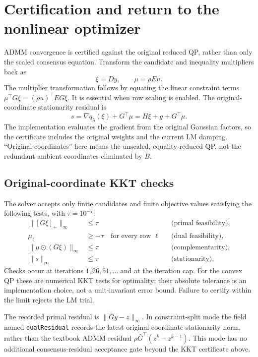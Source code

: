 \documentclass[11pt,letterpaper]{article}
\newcommand{\pos}[1]{[#1]_{+}}
\newcommand{\code}[1]{\texttt{\small #1}}
\begin{document}
\section{Certification and return to the nonlinear optimizer}
ADMM convergence is certified against the original reduced QP, rather than
only the scaled consensus equation. Transform the candidate and inequality
multipliers back as
\begin{equation}
  \xi=Dy,\qquad \mu=\rho E u.
  \label{eq:recover}
\end{equation}
The multiplier transformation follows by equating the linear constraint terms
$\mu^\top G\xi=(\rho u)^\top EG\xi$. It is essential when row scaling is
enabled. The original-coordinate stationarity residual is
\begin{equation}
  s=\nabla q_\lambda(\xi)+G^\top\mu
    =H\xi+g+G^\top\mu.
  \label{eq:stationarity}
\end{equation}
The implementation evaluates the gradient from the original Gaussian factors,
so the certificate includes the original weights and the current LM damping.
``Original coordinates'' here means the unscaled, equality-reduced QP, not
the redundant ambient coordinates eliminated by $B$.

\subsection{Original-coordinate KKT checks}
The solver accepts only finite candidates and finite objective values satisfying
the following tests, with $\tau=10^{-7}$:
\begin{align}
  \|\pos{G\xi}\|_\infty&\leq\tau
      &&\text{(primal feasibility)},\\
  \mu_\ell&\geq-\tau\quad\text{for every row }\ell
      &&\text{(dual feasibility)},\\
  \|\mu\odot(G\xi)\|_\infty&\leq\tau
      &&\text{(complementarity)},\\
  \|s\|_\infty&\leq\tau
      &&\text{(stationarity)}.
\end{align}
Checks occur at iterations $1,26,51,\ldots$ and at the iteration cap. For the
convex QP these are numerical KKT tests for optimality; their absolute
tolerance is an implementation choice, not a unit-invariant error bound.
Failure to certify within the limit rejects the LM trial.

The recorded primal residual is $\|\bar Gy-z\|_\infty$. In constraint-split
mode the field named \code{dualResidual} records the latest original-coordinate
stationarity norm, rather than the textbook ADMM residual
$\rho\bar G^\top(z^k-z^{k-1})$. This mode has no additional consensus-residual
acceptance gate beyond the KKT certificate above.
\end{document}

